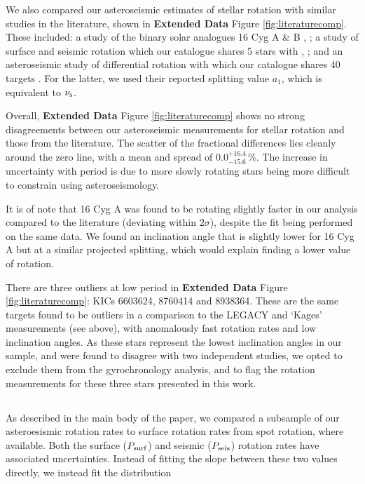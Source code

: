 We also compared our asteroseismic estimates of stellar rotation with similar studies in the literature, shown in \textbf{Extended Data} Figure \ref{fig:literaturecomp}. These included: a study of the binary solar analogues 16 Cyg A \& B \cite{m_davies+2015}, ; a study of surface and seismic rotation which our catalogue shares 5 stars with \cite{m_nielsen+2015}, ; and an asteroseismic study of differential rotation with which our catalogue shares 40 targets \cite{m_benomar+2018}. For the latter, we used their reported splitting value $a_1$, which is equivalent to $\nu_{\rm s}$. 

Overall,  \textbf{Extended Data} Figure \ref{fig:literaturecomp} shows no strong disagreements between our asteroseismic measurements for stellar rotation and those from the literature. The scatter of the fractional differences lies cleanly around the zero line, with a mean and spread of $0.0_{-15.6}^{+16.4}\, \%$. The increase in uncertainty with period is due to more slowly rotating stars being more difficult to constrain using asteroseismology.

It is of note that 16 Cyg A was found to be rotating slightly faster in our analysis compared to the literature \cite{m_davies+2015} (deviating within $2\sigma$), despite the fit being performed on the same data. We found an inclination angle that is slightly lower for 16 Cyg A but at a similar projected splitting, which would explain finding a lower value of rotation.

There are three outliers at low period in  \textbf{Extended Data} Figure \ref{fig:literaturecomp}: KICs 6603624, 8760414 and 8938364. These are the same targets found to be outliers in a comparison to the LEGACY and `Kages' measurements (see above), with anomalously fast rotation rates and low inclination angles. As these stars represent the lowest inclination angles in our sample, and were found to disagree with two independent studies, we opted to exclude them from the gyrochronology analysis, and to flag the rotation measurements for these three stars presented in this work.

\subsection{}
As described in the main body of the paper, we compared a subsample of our asteroesismic rotation rates to surface rotation rates from spot rotation, where available. Both the surface ($P_{\rm surf}$) and seismic ($P_{\rm seis}$) rotation rates have associated uncertainties. Instead of fitting the slope between these two values directly, we instead fit the distribution

